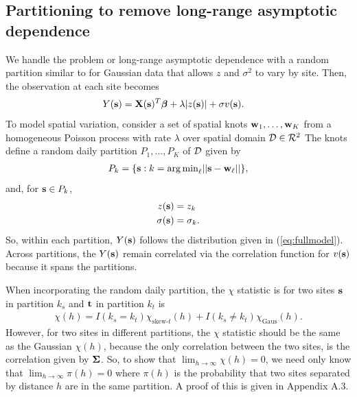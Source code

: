 \documentclass[11pt]{article}
\begin{document}
\subsection{Partitioning to remove long-range asymptotic dependence}\label{s:part}
We handle the problem or long-range asymptotic dependence with a random partition similar to \citet{Kim2005} for Gaussian data that allows $z$ and $\sigma^2$ to vary by site.
Then, the observation at each site becomes
\begin{align}
  Y(\mbox{\bf s}) &= \mbox{\bf X}(\mbox{\bf s})^T \mbox{\boldmath $\beta$} + \lambda |z(\mbox{\bf s})| + \sigma v(\mbox{\bf s}).
\end{align}
To model spatial variation, consider a set of spatial knots $\mbox{\bf w}_1, \ldots, \mbox{\bf w}_K$ from a homogeneous Poisson process with rate $\lambda$ over spatial domain ${\cal D} \in {\cal R}^2$
The knots define a random daily partition $P_{1}, \ldots, P_{K}$ of ${\cal D}$ given by
\begin{align*}
  P_{k} = \{ \mbox{\bf s} : k = {\mathop{\rm arg\, min}}_\ell || \mbox{\bf s} - \mbox{\bf w}_{\ell} || \},
\end{align*}
and, for $\mbox{\bf s} \in P_{k}$,
\begin{align}
  z(\mbox{\bf s}) &= z_{k} \label{eq:sitez}\\
  \sigma(\mbox{\bf s}) &= \sigma_{k} \label{eq:sitesig}.
\end{align}
So, within each partition, $Y(\mbox{\bf s})$ follows the distribution given in (\ref{eq:fullmodel}).
Across partitions, the $Y(\mbox{\bf s})$ remain correlated via the correlation function for $v(\mbox{\bf s})$ because it spans the partitions.

When incorporating the random daily partition, the $\chi$ statistic is for two sites $\mbox{\bf s}$ in partition $k_s$ and $\mbox{\bf t}$ in partition $k_t$ is
\begin{align}
  \chi(h) = I(k_s = k_t) \chi_{\text{skew-}t}(h) + I(k_s \neq k_t) \chi_{\text{Gaus}}(h).
\end{align}
However, for two sites in different partitions, the $\chi$ statistic should be the same as the Gaussian $\chi(h)$, because the only correlation between the two sites, is the correlation given by $\mbox{\boldmath $\Sigma$}$.
So, to show that $\lim_{h \rightarrow \infty} \chi(h) = 0$, we need only know that $\lim_{h \rightarrow \infty} \pi(h) = 0$
where $\pi(h)$ is the probability that two sites separated by distance $h$ are in the same partition.
A proof of this is given in Appendix A.3.
\end{document}
